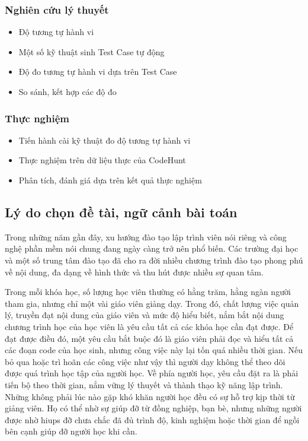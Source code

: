 \subsubsection*{Nghiên cứu lý thuyết}

\begin{itemize}
\item Độ tương tự hành vi
\item Một số kỹ thuật sinh Test Case tự động
\item Độ đo tương tự hành vi dựa trên Test Case
\item So sánh, kết hợp các độ đo
\end{itemize}


\subsubsection*{Thực nghiệm}

\begin{itemize}
\item Tiến hành cài kỹ thuật đo độ tương tự hành vi
\item Thực nghiệm trên dữ liệu thực của CodeHunt
\item Phân tích, đánh giá dựa trên kết quả thực nghiệm
\end{itemize}


\subsection{Lý do chọn đề tài, ngữ cảnh bài toán}
		
Trong những năm gần đây, xu hướng đào tạo lập trình viên nói riêng và
công nghệ phần mềm nói chung đang ngày càng trở nên phổ biến. Các
trường đại học và một số trung tâm đào tạo đã cho ra đời nhiều chương
trình đào tạo phong phú về nội dung, đa dạng về hình thức và thu hút
được nhiều sự quan tâm.
	
Trong mỗi khóa học, số lượng học viên thường có hằng trăm, hằng ngàn
người tham gia, nhưng chỉ một vài giáo viên giảng dạy. Trong đó, chất
lượng việc quản lý, truyền đạt nội dung của giáo viên và mức độ hiểu
biết, nắm bắt nội dung chương trình học của học viên là yêu cầu tất cả
các khóa học cần đạt được. Để đạt được điều đó, một yêu cầu bắt buộc
đó là giáo viên phải đọc và hiểu tất cả các đoạn code của học sinh,
nhưng công việc này lại tốn quá nhiều thời gian. Nếu bỏ qua hoặc trì
hoãn các công việc như vậy thì người dạy không thể theo dõi được quá
trình học tập của người học. Về phía người học, yêu cầu đặt ra là phải
tiến bộ theo thời gian, nắm vững lý thuyết và thành thạo kỹ năng lập
trình. Những không phải lúc nào gặp khó khăn người học đều có sự hỗ
trợ kịp thời từ giảng viên. Họ có thể nhờ sự giúp đỡ từ đồng nghiệp,
bạn bè, nhưng những người được nhờ hiups đỡ chưa chắc đã đủ trình độ,
kinh nghiệm hoặc thời gian để ngồi bên cạnh giúp đỡ người học khi cần.
	
